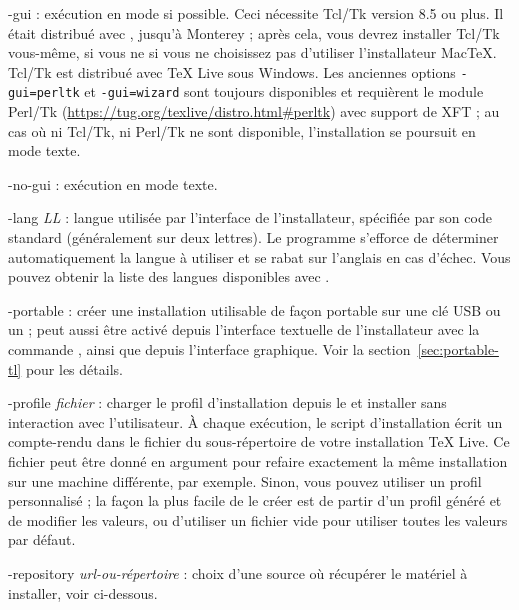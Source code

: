 \documentclass[german, english, french]{article}
\renewcommand{\TL}{\TeX{} Live\xspace}%
\begin{document}
\begin{ttdescription}
\item[-gui] : exécution en mode \GUI{} si possible. Ceci nécessite Tcl/Tk
  version 8.5 ou plus. Il était distribué avec \MacOSX, jusqu'à Monterey ; après
  cela, vous devrez installer Tcl/Tk vous-même, si vous ne si vous ne choisissez
  pas d'utiliser l'installateur MacTeX. Tcl/Tk est distribué avec \TL{} sous
  Windows. Les anciennes options \texttt{-gui=perltk} et \texttt{-gui=wizard}
  sont toujours disponibles et requièrent le module Perl/Tk
  (\url{https://tug.org/texlive/distro.html#perltk}) avec support de XFT ; au
  cas où ni Tcl/Tk, ni Perl/Tk ne sont disponible, l'installation se poursuit en
  mode texte.

\item[-no-gui] : exécution en mode texte.

\item[-lang {\sl LL}] : langue utilisée par l'interface de l'installateur,
  spécifiée par son code standard (généralement sur deux lettres).  Le programme
  s'efforce de déterminer automatiquement la langue à utiliser et se rabat sur
  l'anglais en cas d'échec. Vous pouvez obtenir la liste des langues disponibles
  avec .

\item[-portable] : créer une installation utilisable de façon portable sur une
  clé USB ou un \DVD ; peut aussi être activé depuis l'interface textuelle de
  l'installateur avec la commande , ainsi que depuis l'interface
  graphique.  Voir la section~\ref{sec:portable-tl} pour les détails.

\item[-profile {\sl fichier}] : charger le profil d'installation depuis le
   et installer sans interaction avec l'utilisateur.  À chaque
  exécution, le script d'installation écrit un compte-rendu dans le fichier
   du sous-répertoire  de votre
  installation \TL. Ce fichier peut être donné en argument pour refaire
  exactement la même installation sur une machine différente, par
  exemple. Sinon, vous pouvez utiliser un profil personnalisé ; la façon la plus
  facile de le créer est de partir d'un profil généré et de modifier les
  valeurs, ou d'utiliser un fichier vide pour utiliser toutes les valeurs par
  défaut.

\item[-repository {\sl url-ou-répertoire}] : choix d'une source où récupérer le
  matériel à installer, voir ci-dessous.


\end{ttdescription}
\end{document}
